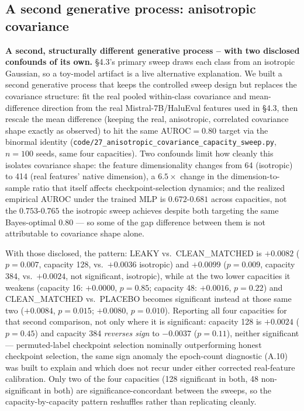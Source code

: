 \documentclass[10pt]{article} %
\begin{document}
\subsection{A second generative process: anisotropic covariance}

\textbf{A second, structurally different generative process -- with two
disclosed confounds of its own.} §4.3's primary sweep draws each class from an isotropic Gaussian, so a toy-model artifact is a live alternative explanation.
We built a second generative process that keeps the controlled sweep design
but replaces the covariance structure: fit the real pooled within-class
covariance and mean-difference direction from the real Mistral-7B/HaluEval features used in §4.3, then rescale the mean difference (keeping the real,
anisotropic, correlated covariance shape exactly as observed) to hit the same
AUROC$=0.80$ target via the binormal identity
(\texttt{code/27\_anisotropic\_covariance\_capacity\_sweep.py}, $n=100$ seeds,
same four capacities). Two confounds limit how cleanly this isolates
covariance shape: the feature dimensionality changes from 64 (isotropic) to
414 (real features' native dimension), a $6.5\times$ change in the
dimension-to-sample ratio that itself affects checkpoint-selection dynamics;
and the realized empirical AUROC under the trained MLP is $0.672$-$0.681$
across capacities, not the $0.753$-$0.765$ the isotropic sweep achieves
despite both targeting the same Bayes-optimal $0.80$ --- so some of the gap
difference between them is not attributable to covariance shape alone.

With those disclosed, the pattern: LEAKY vs.\ CLEAN\_MATCHED is $+0.0082$
($p=0.007$, capacity 128, vs.\ $+0.0036$ isotropic) and $+0.0099$ ($p=0.009$,
capacity 384, vs.\ $+0.0024$, not significant, isotropic), while at the two
lower capacities it weakens (capacity 16: $+0.0000$, $p=0.85$; capacity 48:
$+0.0016$, $p=0.22$) and CLEAN\_MATCHED vs.\ PLACEBO becomes significant
instead at those same two ($+0.0084$, $p=0.015$; $+0.0080$, $p=0.010$).
Reporting all four capacities for that second comparison, not only where it is
significant: capacity 128 is $+0.0024$ ($p=0.45$) and capacity 384
\emph{reverses sign} to $-0.0037$ ($p=0.11$), neither significant ---
permuted-label checkpoint selection nominally outperforming honest checkpoint
selection, the same sign anomaly the epoch-count diagnostic (A.10) was built to explain and which does not recur under either corrected real-feature
calibration. Only two of the four capacities (128 significant in both, 48
non-significant in both) are significance-concordant between the sweeps, so
the capacity-by-capacity pattern reshuffles rather than replicating cleanly.
\end{document}
